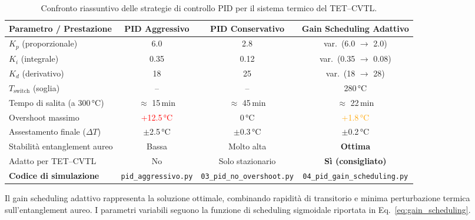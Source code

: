 \documentclass[11pt,a4paper]{article}
\theoremstyle{plain}
\theoremstyle{definition}
\begin{document}
\begin{table}[H]
\centering
\begin{adjustbox}{max width=\textwidth}
\small
\renewcommand{\arraystretch}{1.22}
\begin{tabular}{lccc}
\toprule
\rowcolor{teal!15}
\textbf{Parametro / Prestazione} & 
\textbf{PID Aggressivo} & 
\textbf{PID Conservativo} & 
\textbf{Gain Scheduling Adattivo} \\
\midrule
\(K_p\) (proporzionale)        & 6.0                  & 2.8                  & var.\ (6.0 $\to$ 2.0) \\
\(K_i\) (integrale)            & 0.35                 & 0.12                 & var.\ (0.35 $\to$ 0.08) \\
\(K_d\) (derivativo)           & 18                   & 25                   & var.\ (18 $\to$ 28) \\
\(T_{\text{switch}}\) (soglia) & --                   & --                   & 280\,°C \\
Tempo di salita (a 300\,°C)    & $\approx$ 15\,min    & $\approx$ 45\,min    & $\approx$ 22\,min \\
Overshoot massimo              & \textcolor{red}{+12.5\,°C} & 0\,°C              & \textcolor{orange}{+1.8\,°C} \\
Assestamento finale (\(\Delta T\)) & $\pm$2.5\,°C       & $\pm$0.3\,°C         & $\pm$0.2\,°C \\
Stabilità entanglement aureo   & Bassa                & Molto alta           & \textbf{Ottima} \\
Adatto per TET--CVTL           & No                   & Solo stazionario     & \textbf{Sì (consigliato)} \\
\midrule
\textbf{Codice di simulazione} & \texttt{pid\_aggressivo.py} & 
\texttt{03\_pid\_no\_overshoot.py} & 
\texttt{04\_pid\_gain\_scheduling.py} \\
\bottomrule
\end{tabular}
\end{adjustbox}

\vspace{8pt}

{\small 
Il gain scheduling adattivo rappresenta la soluzione ottimale, combinando rapidità di transitorio e minima perturbazione termica sull'entanglement aureo. 
I parametri variabili seguono la funzione di scheduling sigmoidale riportata in Eq.~\eqref{eq:gain_scheduling}.
}

\caption{Confronto riassuntivo delle strategie di controllo PID per il sistema termico del TET--CVTL.}
\label{tab:pid_comparison}
\end{table}
\end{document}
